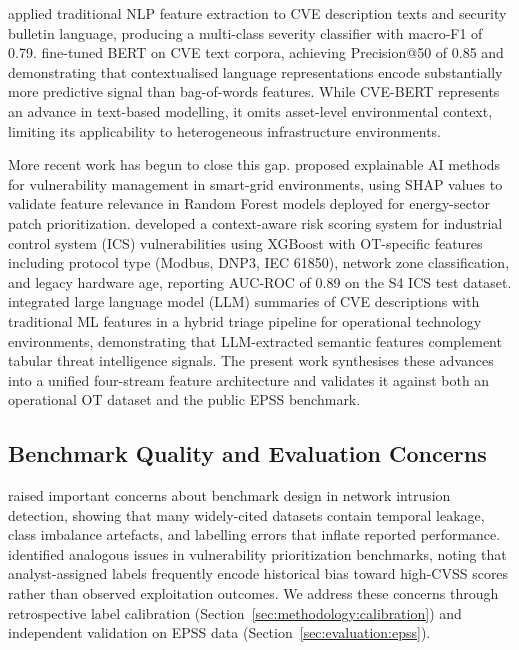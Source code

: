 \documentclass[review,12pt]{elsarticle}
\begin{document}
\citet{vulnpredict} applied traditional NLP feature extraction to CVE description texts and security bulletin language, producing a multi-class severity classifier with macro-F1 of 0.79. \citet{cvebert} fine-tuned BERT on CVE text corpora, achieving Precision@50 of 0.85 and demonstrating that contextualised language representations encode substantially more predictive signal than bag-of-words features. While CVE-BERT represents an advance in text-based modelling, it omits asset-level environmental context, limiting its applicability to heterogeneous infrastructure environments.

More recent work has begun to close this gap. \citet{ramirez2024} proposed explainable AI methods for vulnerability management in smart-grid environments, using SHAP values to validate feature relevance in Random Forest models deployed for energy-sector patch prioritization. \citet{chen2024} developed a context-aware risk scoring system for industrial control system (ICS) vulnerabilities using XGBoost with OT-specific features including protocol type (Modbus, DNP3, IEC 61850), network zone classification, and legacy hardware age, reporting AUC-ROC of 0.89 on the S4 ICS test dataset. \citet{wang2025} integrated large language model (LLM) summaries of CVE descriptions with traditional ML features in a hybrid triage pipeline for operational technology environments, demonstrating that LLM-extracted semantic features complement tabular threat intelligence signals. The present work synthesises these advances into a unified four-stream feature architecture and validates it against both an operational OT dataset and the public EPSS benchmark.

\subsection{Benchmark Quality and Evaluation Concerns}

\citet{flood2024} raised important concerns about benchmark design in network intrusion detection, showing that many widely-cited datasets contain temporal leakage, class imbalance artefacts, and labelling errors that inflate reported performance. \citet{sherif2026} identified analogous issues in vulnerability prioritization benchmarks, noting that analyst-assigned labels frequently encode historical bias toward high-CVSS scores rather than observed exploitation outcomes. We address these concerns through retrospective label calibration (Section~\ref{sec:methodology:calibration}) and independent validation on EPSS data (Section~\ref{sec:evaluation:epss}).
\end{document}

